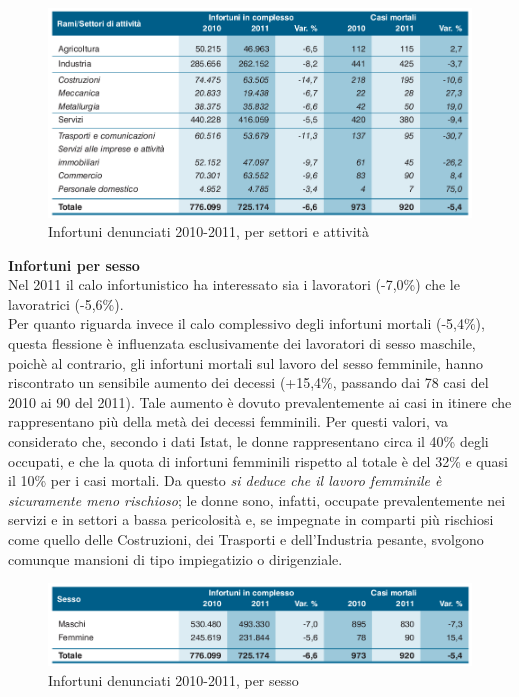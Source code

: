 \begin{figure}[H]
\centering
\includegraphics[scale=0.5]{images/analisiDiMercato/infortuniPerGestione2}
\caption{Infortuni denunciati 2010-2011, per settori e attività}
\end{figure}








\textbf{Infortuni per sesso}\\
Nel 2011 il calo infortunistico ha interessato sia i lavoratori (-7,0\%) che le
lavoratrici (-5,6\%).\\
Per quanto riguarda invece il calo complessivo degli infortuni mortali  (-5,4\%), questa flessione è influenzata esclusivamente dei lavoratori di sesso maschile, poichè al contrario, gli infortuni mortali sul lavoro del sesso femminile, hanno riscontrato un sensibile aumento dei decessi (+15,4\%, passando dai 78 casi del 2010 ai 90 del 2011). Tale aumento è dovuto prevalentemente ai casi in itinere che rappresentano più della metà dei decessi femminili.
Per questi valori, va considerato che, secondo i dati Istat, le donne rappresentano circa il 40\% degli
occupati, e che la quota di infortuni femminili rispetto al totale è del 32\% e quasi il 10\% per
i casi mortali. Da questo \textit{si deduce che il lavoro femminile è sicuramente meno rischioso}; le donne
sono, infatti, occupate prevalentemente nei servizi e in settori a bassa pericolosità e, se
impegnate in comparti più rischiosi come quello delle Costruzioni, dei Trasporti e
dell’Industria pesante, svolgono comunque mansioni di tipo impiegatizio o dirigenziale.


\begin{figure}[H]
\centering
\includegraphics[scale=0.5]{images/analisiDiMercato/infortuniPerSesso1}
\caption{Infortuni denunciati 2010-2011, per sesso}
\end{figure}

